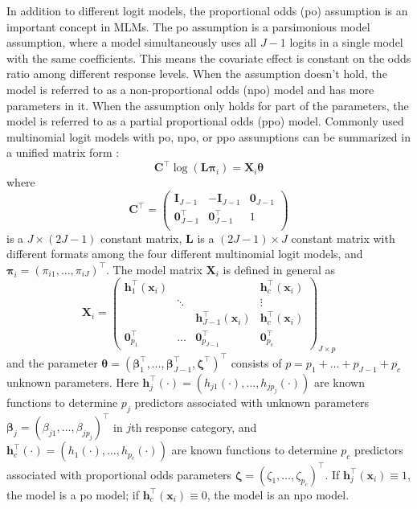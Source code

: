 In addition to different logit models, the proportional odds (po) assumption is an important concept in MLMs. The po assumption is a parsimonious model assumption, where a model simultaneously uses all $J-1$ logits in a single model with the same coefficients. This means the covariate effect is constant on the odds ratio among different response levels. When the assumption doesn't hold, the model is referred to as a non-proportional odds (npo) model and has more parameters in it. When the assumption only holds for part of the parameters, the model is referred to as a partial proportional odds (ppo) model.
Commonly used multinomial logit models with po, npo, or ppo assumptions can be summarized in a unified matrix form \citep{pmcc1995, atkinson1999, bu2020}:
$$\mathbf C^\top \log(\mathbf L \boldsymbol \pi_i) = \mathbf X_i \boldsymbol \theta$$
where $$\mathbf C^\top =
\begin{pmatrix}
  \mathbf I_{J-1} & -\mathbf I_{J-1} & \mathbf 0_{J-1} \\
  \mathbf 0^\top_{J-1} & \mathbf 0^\top_{J-1} & 1 \\
\end{pmatrix}$$
is a $J \times (2J-1)$ constant matrix, $\mathbf L$ is a $(2J-1)\times J$ constant matrix with different formats among the four different multinomial logit models, and $\boldsymbol \pi_i = (\pi_{i1},\dots,\pi_{iJ})^\top$. The model matrix $\mathbf X_i$ is defined in general as
$$\mathbf X_i =
\begin{pmatrix}
  \mathbf h_1^\top(\mathbf x_i)&  &  & \mathbf h_c^\top(\mathbf x_i)\\
  & \ddots & & \vdots\\
  & & \mathbf h_{J-1}^\top (\mathbf x_i) & \mathbf h_{c}^\top (\mathbf x_i)\\
  \mathbf 0^\top_{p_1} & \dots & \mathbf 0^\top_{p_{J-1}} & \mathbf 0^\top_{p_c}
\end{pmatrix}_{J \times p}
$$
and the parameter $\boldsymbol \theta=(\boldsymbol\beta_1^\top, \dots, \boldsymbol \beta^\top_{J-1}, \boldsymbol\zeta^\top)^\top$ consists of $p=p_1 + \dots + p_{J-1}+p_c$ unknown parameters. Here $\mathbf h_j^\top(\cdot) = (h_{j1}(\cdot),\dots, h_{jp_j}(\cdot))$ are known functions to determine $p_j$ predictors associated with unknown parameters $\boldsymbol \beta_j = (\beta_{j1}, \dots, \beta_{jp_{j}})^\top$ in $j$th response category, and $\mathbf h_c^\top(\cdot) = (h_{1}(\cdot),\dots, h_{p_c}(\cdot))$ are known functions to determine $p_c$ predictors associated with proportional odds parameters $\boldsymbol \zeta = (\zeta_1, \dots, \zeta_{p_c})^\top$. If $\mathbf h_j^\top(\mathbf x_i)\equiv1$, the model is a po model; if $\mathbf h_c^\top(\mathbf x_i)\equiv0$, the model is an npo model.

